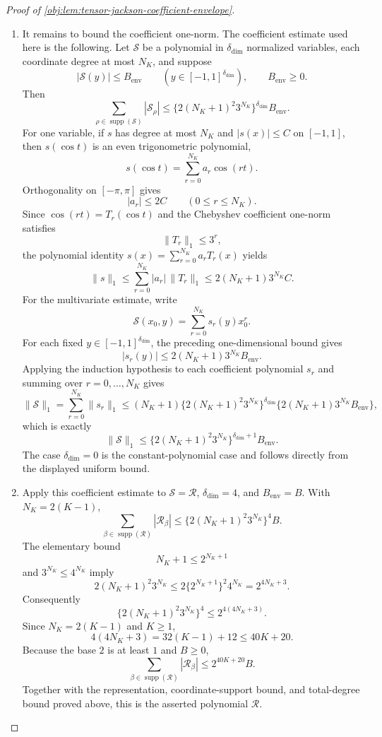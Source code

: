 \begin{proof}[Proof of \cref{obj:lem:tensor-jackson-coefficient-envelope}]
\begin{enumerate}
\item
It remains to bound the coefficient one-norm.  The coefficient estimate used here is the following.  Let \(\mathcal S\) be a polynomial in \(\delta_{\mathrm{dim}}\) normalized variables, each coordinate degree at most \(N_K\), and suppose
\[
|\mathcal S(y)|\le B_{\mathrm{env}}
\qquad
(y\in[-1,1]^{\delta_{\mathrm{dim}}}),
\qquad
B_{\mathrm{env}}\ge0 .
\]
Then
\[
\sum_{\rho\in\operatorname{supp}(\mathcal S)}
|\mathcal S_\rho|
\le
\{2(N_K+1)^2 3^{N_K}\}^{\delta_{\mathrm{dim}}}
B_{\mathrm{env}} .
\]
For one variable, if \(s\) has degree at most \(N_K\) and \(|s(x)|\le C\) on \([-1,1]\), then \(s(\cos t)\) is an even trigonometric polynomial,
\[
s(\cos t)=\sum_{r=0}^{N_K} a_r\cos(rt).
\]
Orthogonality on \([-\pi,\pi]\) gives
\[
|a_r|\le 2C
\qquad (0\le r\le N_K).
\]
Since \(\cos(rt)=T_r(\cos t)\) and the Chebyshev coefficient one-norm satisfies
\[
\|T_r\|_1\le 3^r,
\]
the polynomial identity \(s(x)=\sum_{r=0}^{N_K}a_rT_r(x)\) yields
\[
\|s\|_1
\le
\sum_{r=0}^{N_K}|a_r|\,\|T_r\|_1
\le
2(N_K+1)3^{N_K}C .
\]
For the multivariate estimate, write
\[
\mathcal S(x_0,y)
=
\sum_{r=0}^{N_K}s_r(y)x_0^r .
\]
For each fixed \(y\in[-1,1]^{\delta_{\mathrm{dim}}}\), the preceding one-dimensional bound gives
\[
|s_r(y)|
\le
2(N_K+1)3^{N_K}B_{\mathrm{env}} .
\]
Applying the induction hypothesis to each coefficient polynomial \(s_r\) and summing over \(r=0,\ldots,N_K\) gives
\[
\|\mathcal S\|_1
=
\sum_{r=0}^{N_K}\|s_r\|_1
\le
(N_K+1)\{2(N_K+1)^2 3^{N_K}\}^{\delta_{\mathrm{dim}}}
\{2(N_K+1)3^{N_K}B_{\mathrm{env}}\},
\]
which is exactly
\[
\|\mathcal S\|_1
\le
\{2(N_K+1)^2 3^{N_K}\}^{\delta_{\mathrm{dim}}+1}
B_{\mathrm{env}} .
\]
The case \(\delta_{\mathrm{dim}}=0\) is the constant-polynomial case and follows directly from the displayed uniform bound. %

\item
Apply this coefficient estimate to \(\mathcal S=\mathcal R\), \(\delta_{\mathrm{dim}}=4\), and \(B_{\mathrm{env}}=B\).  With \(N_K=2(K-1)\),
\[
\sum_{\beta\in\operatorname{supp}(\mathcal R)}
|\mathcal R_\beta|
\le
\{2(N_K+1)^2 3^{N_K}\}^{4}B .
\]
The elementary bound
\[
N_K+1\le 2^{N_K+1}
\]
and \(3^{N_K}\le4^{N_K}\) imply
\[
2(N_K+1)^2 3^{N_K}
\le
2\{2^{N_K+1}\}^2 4^{N_K}
=
2^{4N_K+3}.
\]
Consequently
\[
\{2(N_K+1)^2 3^{N_K}\}^{4}
\le
2^{4(4N_K+3)} .
\]
Since \(N_K=2(K-1)\) and \(K\ge1\),
\[
4(4N_K+3)
=
32(K-1)+12
\le
40K+20 .
\]
Because the base \(2\) is at least \(1\) and \(B\ge0\),
\[
\sum_{\beta\in\operatorname{supp}(\mathcal R)}
|\mathcal R_\beta|
\le
2^{40K+20}B .
\]
Together with the representation, coordinate-support bound, and total-degree bound proved above, this is the asserted polynomial \(\mathcal R\). %
\end{enumerate}
\end{proof}
